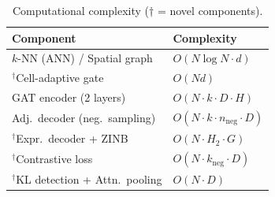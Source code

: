\documentclass{article}
\begin{document}
\begin{table}[h]
\centering
\caption{Computational complexity ($\dagger$ = novel components).}
\label{tab:complexity}
\small
\begin{tabular}{@{}ll@{}}
\toprule
\textbf{Component} & \textbf{Complexity} \\
\midrule
$k$-NN (ANN) / Spatial graph & $O(N \log N \cdot d)$ \\
$^\dagger$Cell-adaptive gate & $O(Nd)$ \\
GAT encoder (2 layers) & $O(N \cdot k \cdot D \cdot H)$ \\
Adj.\ decoder (neg.\ sampling) & $O(N \cdot k \cdot n_{\text{neg}} \cdot D)$ \\
$^\dagger$Expr.\ decoder + ZINB & $O(N \cdot H_2 \cdot G)$ \\
$^\dagger$Contrastive loss & $O(N \cdot k_{\text{neg}} \cdot D)$ \\
$^\dagger$KL detection + Attn.\ pooling & $O(N \cdot D)$ \\
\bottomrule
\end{tabular}
\end{table}





\end{document}
